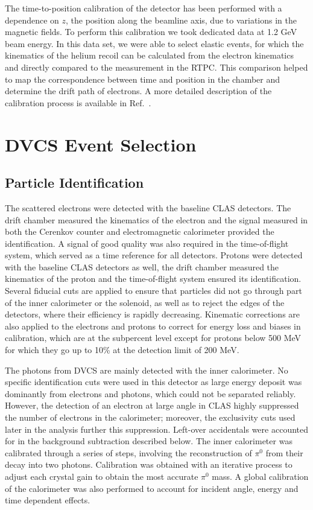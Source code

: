 \documentclass[aps,prc,preprint,superscriptaddress]{revtex4}
\begin{document}
The time-to-position calibration of the detector has been performed with a 
dependence on $z$, the position along the beamline axis, due to 
variations in the magnetic fields. To perform this calibration we took  
dedicated data at 1.2 GeV beam energy. In 
this data set, we were able to select elastic events, for which the kinematics
of the helium recoil can be calculated from the electron kinematics and 
directly compared to the measurement in the RTPC. This comparison helped to 
map the correspondence between time and position in the chamber and determine 
the drift path of electrons. A more detailed description of the calibration process 
is available in Ref.~\cite{Dupre:2017upj}.

\section{DVCS Event Selection}

\subsection{Particle Identification}

The scattered electrons were detected with the baseline CLAS detectors. The drift chamber measured the kinematics
of the electron and the signal measured in both the Cerenkov counter and electromagnetic calorimeter
provided the identification. A signal of good quality was also required in the 
time-of-flight system, which served as a time reference for all detectors. 
Protons were detected with the baseline CLAS detectors as well, the drift chamber measured the kinematics
of the proton and the time-of-flight system ensured its identification. Several 
fiducial cuts are applied to ensure that particles did not go through part of the inner calorimeter 
or the solenoid, as well as to reject the edges of the detectors, where their efficiency is rapidly 
decreasing. Kinematic corrections are also applied to the electrons and protons to correct for energy loss
and biases in calibration, which are at the subpercent level except for protons below 500 MeV for which they
go up to 10\% at the detection limit of 200 MeV.

The photons from DVCS are mainly detected with the inner calorimeter. No specific 
identification cuts were used in this detector as large energy deposit was dominantly 
from electrons and photons, which could not be separated reliably. However, the detection 
of an electron at large angle in CLAS highly suppressed the number of electrons 
in the calorimeter; moreover, the exclusivity cuts used later in the analysis further 
this suppression. Left-over accidentals were accounted for in the background subtraction 
described below. The inner calorimeter was calibrated through a series of steps, 
involving the reconstruction of $\pi^0$ from their decay into two photons. Calibration was obtained 
with an iterative process to adjust each crystal gain to obtain the most accurate $\pi^0$ mass. A
global calibration of the calorimeter was also performed to account for incident angle, energy and 
time dependent effects.
\end{document}
